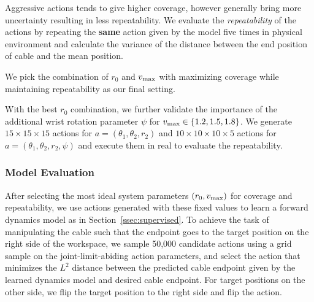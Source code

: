 \documentclass[letterpaper, 10 pt, conference]{ieeeconf}  %
\newcommand{\ba}{\mathbf{a}}
\newcommand{\vmax}{v_{\rm max}}
\begin{document}
Aggressive actions tends to give higher coverage, however generally bring more uncertainty resulting in less repeatability. We evaluate the \emph{repeatability} of the actions by repeating the \textbf{same} action given by the model five times in physical environment and calculate the variance of the distance between the end position of cable and the mean position.

We pick the combination of $r_0$ and $\vmax$ with maximizing coverage while maintaining repeatability as our final setting.

With the best $r_0$ combination, we further validate the importance of the additional wrist rotation parameter $\psi$ for $\vmax \in \{1.2,1.5,1.8\}$. We generate $15\times15\times15$ actions for $a=(\theta_1,\theta_2,r_2)$ and $10\times10\times10\times5$ actions for $a=(\theta_1,\theta_2,r_2, \psi)$ and execute them in real to evaluate the repeatability.

\subsubsection{Model Evaluation}
After selecting the most ideal system parameters $(r_0, \vmax)$ for coverage and repeatability, we use actions generated with these fixed values to learn a forward dynamics model as in Section~\ref{ssec:supervised}. To achieve the task of manipulating the cable such that the endpoint goes to the target position on the right side of the workspace, we sample 50,000 candidate actions using a grid sample on the joint-limit-abiding action parameters, and select the action that minimizes the $L^2$ distance between the predicted cable endpoint given by the learned dynamics model and desired cable endpoint. For target positions on the other side, we flip the target position to the right side and flip the action.
\end{document}
